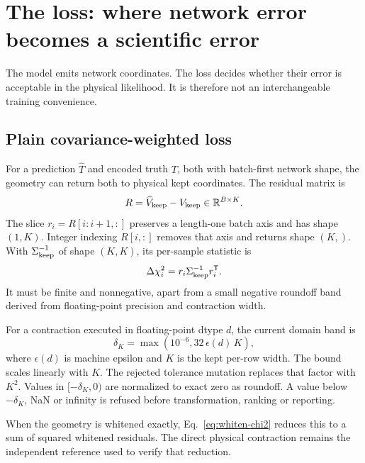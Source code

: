 \documentclass[10pt,aps,prd,twocolumn,nofootinbib]{revtex4-2}
\begin{document}
\section{The loss: where network error becomes a scientific error}
\label{chap:loss}

The model emits network coordinates.  The loss decides whether their error is
acceptable in the physical likelihood.  It is therefore not an interchangeable
training convenience.

\subsection{Plain covariance-weighted loss}

For a prediction $\widehat T$ and encoded truth $T$, both with batch-first
network shape, the geometry can return both to physical kept coordinates.
The residual matrix is
\begin{equation}
  R = \widehat V_{\rm keep}-V_{\rm keep}
  \in\mathbb R^{B\times K}.
\end{equation}
The slice $r_i=R[i:i+1,:]$ preserves a length-one batch axis and has shape
$(1,K)$.  Integer indexing $R[i,:]$ removes that axis and returns shape
$(K,)$.  With
$\Sigma_{\rm keep}^{-1}$ of shape $(K,K)$, its per-sample statistic is
\begin{equation}
  \Delta\chi_i^2=r_i\Sigma_{\rm keep}^{-1}r_i^{\mathsf T}.
  \label{eq:dchi2}
\end{equation}
It must be finite and nonnegative, apart from a small negative roundoff band
derived from floating-point precision and contraction width.

For a contraction executed in floating-point dtype $d$, the current domain
band is
\begin{equation*}
 \delta_K=\max\!\left(10^{-6},32\,\epsilon(d)\,K\right),
\end{equation*}
where $\epsilon(d)$ is machine epsilon and $K$ is the kept per-row width.  The
bound scales linearly with $K$.  The rejected tolerance mutation replaces that
factor with $K^2$.  Values in $[-\delta_K,0)$ are normalized to exact zero as roundoff.
A value below $-\delta_K$, NaN or infinity is refused before transformation,
ranking or reporting.

When the geometry is whitened exactly, Eq.~\eqref{eq:whiten-chi2} reduces this
to a sum of squared whitened residuals.  The direct physical contraction
remains the independent reference used to verify that reduction.
\end{document}
